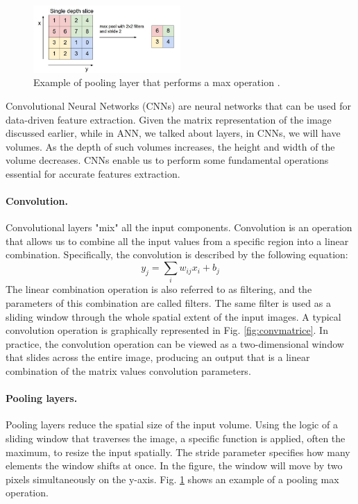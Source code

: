 \begin{figure}
    \centering
    \includegraphics[width=0.5\textwidth]{Images/pooling.png}
    \caption[Pooling layer.]{Example of pooling layer that performs a max operation \cite{giacomo_boracchi_convolutional_2021}.}
    \label{fig:poolingmax}
\end{figure}
Convolutional Neural Networks (CNNs) are neural networks that can be used for data-driven feature extraction. Given the matrix representation of the image discussed earlier, while in ANN, we talked about layers, in CNNs, we will have volumes. As the depth of such volumes increases, the height and width of the volume decreases. CNNs enable us to perform some fundamental operations essential for accurate features extraction.
\paragraph{Convolution.} Convolutional layers "mix" all the input components. Convolution is an operation that allows us to combine all the input values from a specific region into a linear combination. Specifically, the convolution is described by the following equation:
\begin{equation}
    \label{eq:convolution}
    y_j=\sum_iw_{ij}x_i+b_j
\end{equation}
The linear combination operation is also referred to as filtering, and the parameters of this combination are called filters. The same filter is used as a sliding window through the whole spatial extent of the input images. A typical convolution operation is graphically represented in Fig. \ref{fig:convmatrice}.
In practice, the convolution operation can be viewed as a two-dimensional window that slides across the entire image, producing an output that is a linear combination of the matrix values convolution parameters.
\paragraph{Pooling layers.} Pooling layers reduce the spatial size of the input volume. Using the logic of a sliding window that traverses the image, a specific function is applied, often the maximum, to resize the input spatially.
The stride parameter specifies how many elements the window shifts at once. In the figure, the window will move by two pixels simultaneously on the y-axis. Fig. \ref{fig:poolingmax} shows an example of a pooling max operation.
